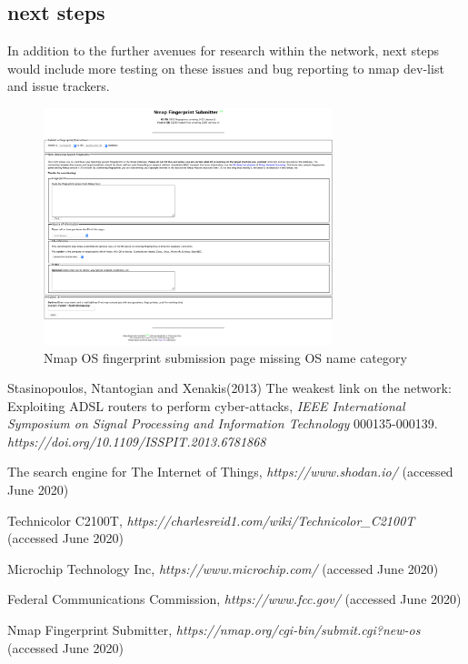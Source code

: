\documentclass[10pt]{article}
\begin{document}
\medskip

\subsection*{next steps}
In addition to the further avenues for research within the network, next steps would include more testing on these issues and bug reporting to nmap dev-list and issue
trackers.

\begin{figure}[H]
\centering
\includegraphics[width=0.75\textwidth]{bug.png}
\caption{Nmap OS fingerprint submission page missing OS name category}\label{bug image}
\end{figure}

\begin{thebibliography}{9} 

 Stasinopoulos, Ntantogian and  Xenakis(2013) The weakest link on the network: Exploiting ADSL routers to perform cyber-attacks, \textit{IEEE International Symposium on Signal Processing and Information Technology} 000135-000139. \textit {https://doi.org/10.1109/ISSPIT.2013.6781868}

 The search engine for The Internet of Things, \textit{https://www.shodan.io/} (accessed June 2020)

 Technicolor C2100T, \textit{https://charlesreid1.com/wiki/Technicolor\_C2100T} (accessed June 2020)

 Microchip Technology Inc, \textit{https://www.microchip.com/} (accessed June 2020)

 Federal Communications Commission, \textit{https://www.fcc.gov/} (accessed June 2020)

 Nmap Fingerprint Submitter, \textit{https://nmap.org/cgi-bin/submit.cgi?new-os} (accessed June 2020)

\end{thebibliography}
\end{document}

